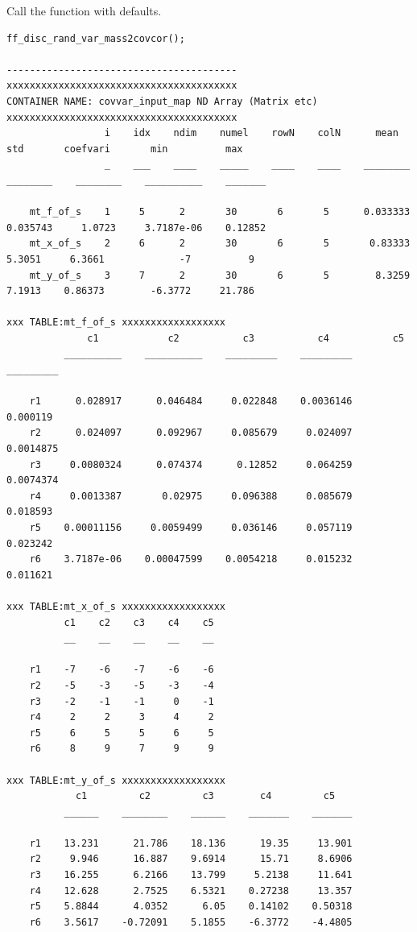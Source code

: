 \documentclass[
]{book}
\begin{document}
Call the function with defaults.

\begin{verbatim}
ff_disc_rand_var_mass2covcor();

----------------------------------------
xxxxxxxxxxxxxxxxxxxxxxxxxxxxxxxxxxxxxxxx
CONTAINER NAME: covvar_input_map ND Array (Matrix etc)
xxxxxxxxxxxxxxxxxxxxxxxxxxxxxxxxxxxxxxxx
                 i    idx    ndim    numel    rowN    colN      mean        std       coefvari       min          max  
                 _    ___    ____    _____    ____    ____    ________    ________    ________    __________    _______

    mt_f_of_s    1     5      2       30       6       5      0.033333    0.035743     1.0723     3.7187e-06    0.12852
    mt_x_of_s    2     6      2       30       6       5       0.83333      5.3051     6.3661             -7          9
    mt_y_of_s    3     7      2       30       6       5        8.3259      7.1913    0.86373        -6.3772     21.786

xxx TABLE:mt_f_of_s xxxxxxxxxxxxxxxxxx
              c1            c2           c3           c4           c5    
          __________    __________    _________    _________    _________

    r1      0.028917      0.046484     0.022848    0.0036146     0.000119
    r2      0.024097      0.092967     0.085679     0.024097    0.0014875
    r3     0.0080324      0.074374      0.12852     0.064259    0.0074374
    r4     0.0013387       0.02975     0.096388     0.085679     0.018593
    r5    0.00011156     0.0059499     0.036146     0.057119     0.023242
    r6    3.7187e-06    0.00047599    0.0054218     0.015232     0.011621

xxx TABLE:mt_x_of_s xxxxxxxxxxxxxxxxxx
          c1    c2    c3    c4    c5
          __    __    __    __    __

    r1    -7    -6    -7    -6    -6
    r2    -5    -3    -5    -3    -4
    r3    -2    -1    -1     0    -1
    r4     2     2     3     4     2
    r5     6     5     5     6     5
    r6     8     9     7     9     9

xxx TABLE:mt_y_of_s xxxxxxxxxxxxxxxxxx
            c1         c2         c3        c4         c5   
          ______    ________    ______    _______    _______

    r1    13.231      21.786    18.136      19.35     13.901
    r2     9.946      16.887    9.6914      15.71     8.6906
    r3    16.255      6.2166    13.799     5.2138     11.641
    r4    12.628      2.7525    6.5321    0.27238     13.357
    r5    5.8844      4.0352      6.05    0.14102    0.50318
    r6    3.5617    -0.72091    5.1855    -6.3772    -4.4805


\end{verbatim}
\end{document}
